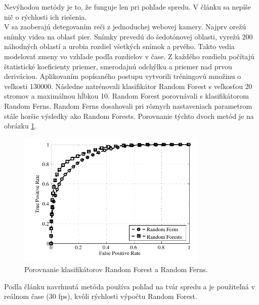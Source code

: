 Nevýhodou metódy je to, že funguje len pri pohľade spredu. V článku sa nepíše nič o rýchlosti ich riešenia.\\

V \cite{vieriu2014real} sa zaoberajú detegovaním reči z jednoduchej webovej kamery. 
Najprv orežú snímky videa na oblasť pier.
Snímky prevedú do šedotónovej oblasti, vyrežú 200 náhodných oblastí a urobia rozdiel všetkých snímok a prvého. 
Takto vedia modelovať zmeny vo vzhľade podľa rozdielov v čase.
Z každého rozdielu počítajú štatistické koeficienty priemer, smerodajnú odchýlku a priemer nad prvou deriváciou. 
Aplikovaním popísaného postupu vytvorili tréningovú množinu o veľkosti 130000.
Následne natrénovali klasifikátor Random Forest s veľkosťou 20 stromov a maximálnou hĺbkou 10. 
Random Forest porovnávali s klasifikátorom Random Ferns. 
Random Ferns dosahovali pri rôznych nastaveniach parametrom stále horšie výsledky ako Random Forests.
Porovnanie týchto dvoch metód je na obrázku \ref{pic-ferns&forests}.

\begin{figure}[H]
	\begin{center}
		\includegraphics[height=6.5cm]{pics/ferns&forests.png}
		\caption{Porovnanie klasifikátorov Random Forest a Random Ferns.
		 \cite{vieriu2014real}}
		\label{pic-ferns&forests}
	\end{center}
\end{figure}

Podľa článku navrhnutá metóda používa pohľad na tvár spredu a je použiteľná v reálnom čase (30 fps), kvôli rýchlosti výpočtu Random Forest.\\

